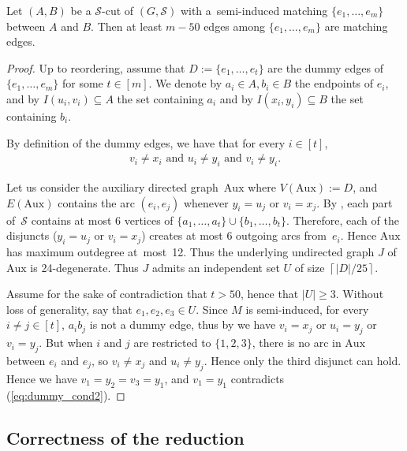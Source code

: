 \documentclass[a4paper,UKenglish,cleveref,hyperref,autoref]{lipics-v2021}
\newcommand{\Aux}{\text{Aux}}
\begin{document}
\begin{lemma}\label{lem:mim-width-local}
  Let $(A, B)$ be a $\mathcal S$-cut of $(G, \mathcal S)$ with a~semi-induced matching $\{e_1, \ldots, e_m\}$ between $A$ and $B$.
  Then at least $m - 50$ edges among $\{e_1, \ldots, e_m\}$ are matching edges.
\end{lemma}
\begin{proof}
Up to reordering, assume that $D := \{e_1, \ldots, e_t\}$ are the dummy edges of $\{e_1, \ldots, e_m\}$ for some $t \in [m]$.
We denote by $a_i \in A, b_i \in B$ the endpoints of $e_i$, and by $I(u_i, v_i) \subseteq A$ the set containing $a_i$ and by $I(x_i, y_i) \subseteq B$ the set containing $b_i$. 

By definition of the dummy edges, we have that for every $i \in [t]$,
\begin{align}
  \label{eq:dummy_cond2} v_i \neq x_i \text{ and } u_i \neq y_i \text{ and }v_i \neq y_i.
\end{align}

Let us consider the auxiliary directed graph~$\Aux$ where $V(\Aux):= D$, and $E(\Aux)$ contains the arc $(e_i, e_j)$ whenever $y_i = u_j$ or $v_i = x_j$.
By , each part of~$\mathcal S$ contains at most 6 vertices of $\{a_1, \dots, a_t \} \cup \{b_1, \dots, b_t\}$.
Therefore, each of the disjuncts ($y_i = u_j$ or $v_i = x_j$) creates at most 6 outgoing arcs from~$e_i$.
Hence $\Aux$ has maximum outdegree at~most~12.
Thus the underlying undirected graph $J$ of $\Aux$ is 24-degenerate.
Thus $J$ admits an independent set $U$ of size $\left\lceil |D|/25 \right\rceil$.

Assume for the sake of contradiction that $t > 50$, hence that $|U| \geqslant 3$.
Without loss of generality, say that $e_1, e_2, e_3 \in U$.
Since $M$ is semi-induced, for every $i \neq j \in [t]$, $a_ib_j$ is not a dummy edge, thus by  we have $v_i = x_j$ or $u_i = y_j$ or $v_i = y_j$.
But when $i$ and $j$ are restricted to $\{1, 2, 3\}$, there is no arc in $\Aux$ between $e_i$ and $e_j$, so $v_i \neq x_j$ and $u_i \neq y_j$. 
  Hence only the third disjunct can hold.
  Hence we have $v_1 = y_2 = v_3 = y_1$, and $v_1 = y_1$ contradicts (\ref{eq:dummy_cond2}).
\end{proof}

\subsection{Correctness of the reduction}
\end{document}
